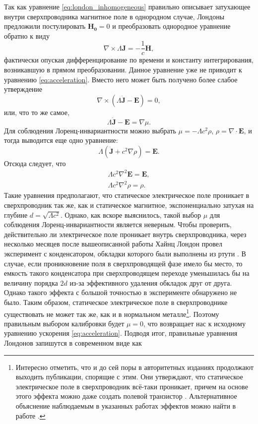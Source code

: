 \documentclass[14pt, a4paper]{extreport}
\numberwithin{equation}{section}
\begin{document}
Так как уравнение \eqref{eq:london_inhomogeneous} правильно описывает затухающее внутри сверхпроводника магнитное поле в однородном случае, Лондоны предложили постулировать $\mathbf{H_0} = 0$ и преобразовать однородное уравнение обратно к виду
\begin{equation}
	\nabla \times \Lambda \mathbf J = -\frac{1}{c} \mathbf{H},\label{eq:london_first}
\end{equation}
фактически опуская дифференцирование по времени и константу интегрирования, возникавшую в прямом преобразовании. Данное уравнение уже не приводит к уравнению \eqref{eq:acceleration}. Вместо него может быть получено более слабое утверждение
\begin{equation}
	\nabla \times (\Lambda \dot{\mathbf J} - \mathbf E)  = 0,
\end{equation}
или, что то же самое,
\begin{equation}
	 \Lambda \dot{\mathbf J} - \mathbf E = \nabla \mu. \label{eq:london_second}
\end{equation}
Для соблюдения Лоренц-инвариантности можно выбрать $\mu = -\Lambda c^2 \rho$, $\rho = \nabla\cdot\mathbf E$, и тогда выводится еще одно уравнение:
\begin{equation}
	\Lambda (\dot{\mathbf J} + c^2 \nabla \rho) = \mathbf E.
\end{equation}
Отсюда следует, что 
\begin{gather}
	\Lambda c^2 \nabla^2 \mathbf E = \mathbf E,\\
	\Lambda c^2 \nabla^2 \rho = \rho.
\end{gather}
Такие уравнения предполагают, что статическое электрическое поле проникает в сверхпроводник так же, как и статическое магнитное, экспоненциально затухая на глубине $d = \sqrt{\Lambda c^2}$. Однако, как вскоре выяснилось, такой выбор $\mu$ для соблюдения Лоренц-инвариантности является неверным. Чтобы проверить, действительно ли электрическое поле проникает внутрь сверхпроводника, через несколько месяцев после вышеописанной работы Хайнц Лондон провел эксперимент с конденсатором, обкладки которого были выполнены из ртути \cite{london1936experimental}. В случае, если проникновение поля в сверхпроводящей фазе имело бы место, то емкость такого конденсатора при сверхпроводящем переходе уменьшилась бы на величину порядка $2d$ из-за эффективного удаления обкладок друг от друга. Однако такого эффекта с большой точностью в эксперименте обнаружено не было. Таким образом, статическое электрическое поле в сверхпроводнике существовать не может так же, как и в нормальном металле\footnote{Интересно отметить, что и до сей поры в авторитетных изданиях продолжают выходить публикации, спорящие с этим. Они утверждают, что статическое электрическое поле в сверхпроводник всё-таки проникает, причем на основе этого эффекта можно даже создать полевой транзистор \cite{de2018metallic, paolucci2018ultra}. Альтернативное объяснение наблюдаемым в указанных работах эффектов можно найти в работе \cite{golokolenov2020origin}.}. Поэтому  правильным выбором калибровки будет $\mu=0$, что возвращает нас к исходному уравнению ускорения \eqref{eq:acceleration}. Подводя итог, правильные уравнения Лондонов запишутся в современном виде как
\end{document}
